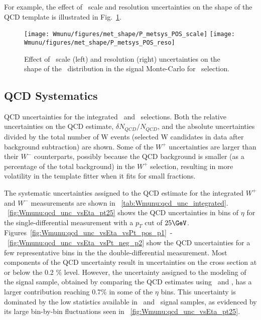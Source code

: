 For example, the effect of \MET\ scale and resolution uncertainties on the shape of the QCD template is illustrated in Fig.~\ref{fig:Wmunu:qcd_met_shapes_pthard}.

\begin{figure}[phtb]
  \begin{center}
    \texttt{[image: Wmunu/figures/met\_shape/P\_metsys\_POS\_scale]}
    \texttt{[image: Wmunu/figures/met\_shape/P\_metsys\_POS\_reso]}
    \caption{Effect of \MET\ scale (left) and resolution (right) uncertainties on the shape of the \MET\ distribution in the signal Monte-Carlo for \Wmunup\ selection.}
    \label{fig:Wmunu:qcd_met_shapes_pthard}
  \end{center}
\end{figure}

\subsection{QCD Systematics}
\label{sec:bg:qcdsyst}

\begin{table}
  \footnotesize
  \begin{center}
  
    \caption{QCD uncertainties for the integrated \Wmunup\ and \Wmunum\ selections. Both the relative uncertainties on the QCD estimate, $\delta N_{QCD} / N_{QCD}$, and the absolute uncertainties divided by the total number of W events (selected W candidates in data after background subtraction) are shown. Some of the $W^+$ uncertainties are larger than their $W^-$ counterparts, possibly because the QCD background is smaller (as a percentage of the total background) in the $W^+$ selection, resulting in more volatility in the template fitter when it fits for small fractions. }
    \label{tab:Wmunu:qcd_unc_integrated}
  \end{center}
\end{table}

The systematic uncertainties assigned to the QCD estimate for the integrated $W^+$ and $W^-$ measurements are shown in \Tab~\ref{tab:Wmunu:qcd_unc_integrated}. \Fig~\ref{fig:Wmunu:qcd_unc_vsEta_pt25} shows the QCD uncertainties in bins of $\eta$ for the single-differential measurement with a $p_{T}$ cut of $25 \GeV$. Figures~\ref{fig:Wmunu:qcd_unc_vsEta_vsPt_pos_p1}~-~\ref{fig:Wmunu:qcd_unc_vsEta_vsPt_neg_p2} show the QCD uncertainties for a few representative bins in the the double-differential measurement.
Most components of the QCD uncertainty result in uncertainties on the cross section at or below the 0.2 \% level. However, the uncertainty assigned to the modeling of the signal sample, obtained by comparing the QCD estimates using \Powheg\Herwig\ and \Mcatnlo, has a larger contribution reaching 0.7\% in some of the $\eta$ bins. This uncertainty is dominated by the low statistics available in \Powheg\Herwig\ and \Mcatnlo\ signal samples, as evidenced by its large bin-by-bin fluctuations seen in \Fig~\ref{fig:Wmunu:qcd_unc_vsEta_pt25}.

